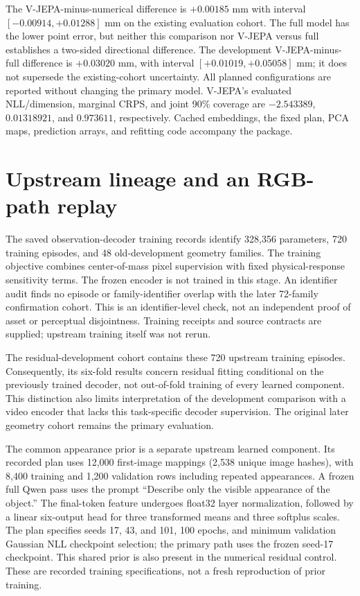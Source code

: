The V-JEPA-minus-numerical difference is $+0.00185$ mm with interval $[-0.00914,+0.01288]$ mm on the existing evaluation cohort. The full model has the lower point error, but neither this comparison nor V-JEPA versus full establishes a two-sided directional difference. The development V-JEPA-minus-full difference is $+0.03020$ mm, with interval $[+0.01019,+0.05058]$ mm; it does not supersede the existing-cohort uncertainty. All planned configurations are reported without changing the primary model. V-JEPA's evaluated NLL/dimension, marginal CRPS, and joint 90\% coverage are $-2.543389$, $0.01318921$, and $0.973611$, respectively. Cached embeddings, the fixed plan, PCA maps, prediction arrays, and refitting code accompany the package.

\section{Upstream lineage and an RGB-path replay}
The saved observation-decoder training records identify 328,356 parameters, 720 training episodes, and 48 old-development geometry families. The training objective combines center-of-mass pixel supervision with fixed physical-response sensitivity terms. The frozen encoder is not trained in this stage. An identifier audit finds no episode or family-identifier overlap with the later 72-family confirmation cohort. This is an identifier-level check, not an independent proof of asset or perceptual disjointness. Training receipts and source contracts are supplied; upstream training itself was not rerun.

The residual-development cohort contains these 720 upstream training episodes. Consequently, its six-fold results concern residual fitting conditional on the previously trained decoder, not out-of-fold training of every learned component. This distinction also limits interpretation of the development comparison with a video encoder that lacks this task-specific decoder supervision. The original later geometry cohort remains the primary evaluation.

The common appearance prior is a separate upstream learned component. Its recorded plan uses 12,000 first-image mappings (2,538 unique image hashes), with 8,400 training and 1,200 validation rows including repeated appearances. A frozen full Qwen pass uses the prompt ``Describe only the visible appearance of the object.'' The final-token feature undergoes float32 layer normalization, followed by a linear six-output head for three transformed means and three softplus scales. The plan specifies seeds 17, 43, and 101, 100 epochs, and minimum validation Gaussian NLL checkpoint selection; the primary path uses the frozen seed-17 checkpoint. This shared prior is also present in the numerical residual control. These are recorded training specifications, not a fresh reproduction of prior training.

